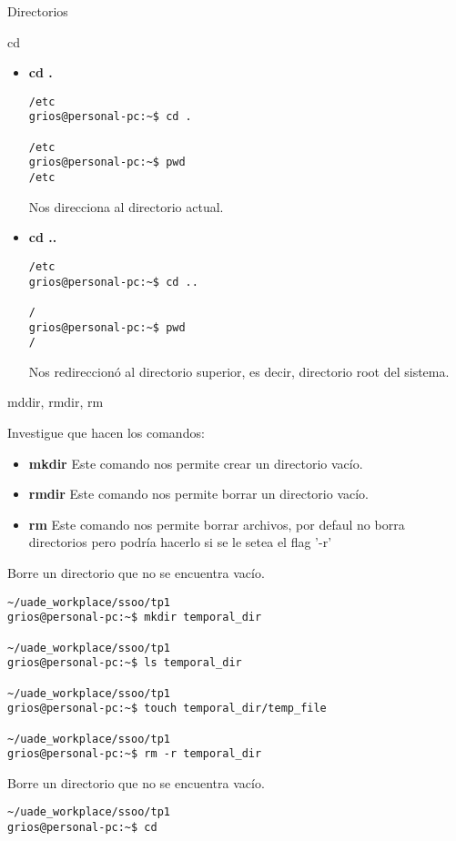 \begin{section}{Directorios}
\begin{subsection}{cd}
\begin{itemize}
\item \textbf{cd .}
\begin{lstlisting}[style=Ubuntu]
/etc
grios@personal-pc:~$ cd .

/etc
grios@personal-pc:~$ pwd
/etc
\end{lstlisting}
Nos direcciona al directorio actual.

\item \textbf{cd ..}
\begin{lstlisting}[style=Ubuntu]
/etc
grios@personal-pc:~$ cd ..

/
grios@personal-pc:~$ pwd
/
\end{lstlisting}
Nos redireccionó al directorio superior, es decir, directorio root del sistema.
\end{itemize}

\end{subsection}

\begin{subsection}{mddir, rmdir, rm}
\begin{quoting}
Investigue que hacen los comandos:
\end{quoting}

\begin{itemize}
\item \textbf{mkdir}
Este comando nos permite crear un directorio vacío.
\item \textbf{rmdir}
Este comando nos permite borrar un directorio vacío.
\item \textbf{rm}
Este comando nos permite borrar archivos, por defaul no borra directorios pero podría hacerlo si se le setea el flag '-r'
\end{itemize}


\begin{quoting}
Borre un directorio que no se encuentra vacío.
\end{quoting}
\begin{lstlisting}[style=Ubuntu]
~/uade_workplace/ssoo/tp1
grios@personal-pc:~$ mkdir temporal_dir

~/uade_workplace/ssoo/tp1
grios@personal-pc:~$ ls temporal_dir 

~/uade_workplace/ssoo/tp1
grios@personal-pc:~$ touch temporal_dir/temp_file

~/uade_workplace/ssoo/tp1
grios@personal-pc:~$ rm -r temporal_dir
\end{lstlisting}

\begin{quoting}
Borre un directorio que no se encuentra vacío.
\end{quoting}
\begin{lstlisting}[style=Ubuntu]
~/uade_workplace/ssoo/tp1
grios@personal-pc:~$ cd


\end{lstlisting}
\end{subsection}
\end{section}
